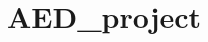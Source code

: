 \chapter{AED\+\_\+project}
\hypertarget{md__r_e_a_d_m_e}{}\label{md__r_e_a_d_m_e}
\label{md__r_e_a_d_m_e_autotoc_md0}%
%
